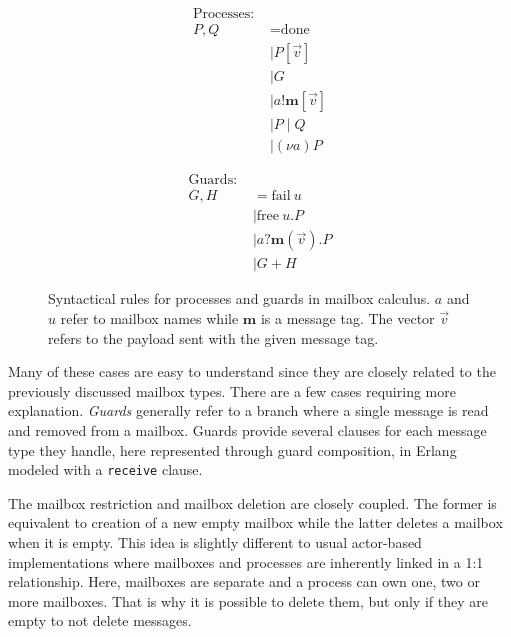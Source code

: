 \begin{figure}[ht]
    \begin{minipage}[c]{0.48\textwidth}
        \begin{align*}
    \text{Processes: } \\
    P, Q &= \text{done} \tag{termination}\\
    &\mid P[\vec{v}] \tag{invocation}\\
    &\mid G \tag{guarded process}\\
    &\mid a!\textbf{m}[\vec{v}] \tag{stored message}\\
    &\mid P \mid Q \tag{parallel composition}\\
    &\mid (\nu a) P \tag{mailbox restriction}
        \end{align*}
    \end{minipage}
    \hfill
    \begin{minipage}[c]{0.48\textwidth}
        \begin{align*}
    \text{Guards: } \\
    G, H &= \text{fail}\ u \tag{runtime error}\\
    &\mid \text{free}\ u.P \tag{mailbox deletion}\\
    &\mid a?\textbf{m}(\vec{v}).P \tag{selective receive}\\
    &\mid G + H \tag{guard composition}
        \end{align*}
        \vfill
    \end{minipage}
\caption{Syntactical rules for processes and guards in mailbox calculus\cite{deliguoroMailboxTypesUnordered2018}. $a$ and $u$ refer to mailbox names while $\textbf{m}$ is a message tag. The vector $\vec{v}$ refers to the payload sent with the given message tag.}
\label{fig:mailboxCalcSyntax}
\end{figure}

Many of these cases are easy to understand since they are closely related to the previously discussed mailbox types. There are a few cases requiring more explanation. \textit{Guards} generally refer to a branch where a single message is read and removed from a mailbox. Guards provide several clauses for each message type they handle, here represented through guard composition, in Erlang modeled with a \lstinline|receive| clause.

The mailbox restriction and mailbox deletion are closely coupled. The former is equivalent to creation of a new empty mailbox while the latter deletes a mailbox when it is empty. This idea is slightly different to usual actor-based implementations where mailboxes and processes are inherently linked in a 1:1 relationship. Here, mailboxes are separate and a process can own one, two or more mailboxes. That is why it is possible to delete them, but only if they are empty to not delete messages.

